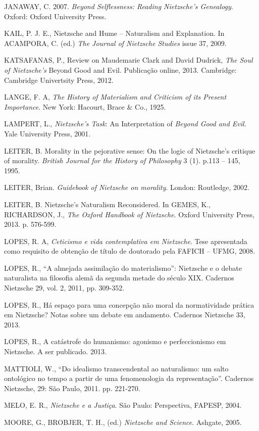 \documentclass[
	12pt,				%
	openright,			%
	oneside,			%
	a4paper,			%
	english,			%
	french,				%
	spanish,			%
	brazil				%
	]{abntex2}
\begin{document}
JANAWAY, C. 2007. \textit{Beyond Selflessness: Reading Nietzsche’s Genealogy}. Oxford: Oxford University Press.

KAIL, P. J. E., Nietzsche and Hume – Naturalism and Explanation. In ACAMPORA, C. (ed.) \textit{The Journal of Nietzsche Studies} issue 37, 2009.

KATSAFANAS, P., Review on Maudemarie Clark and David Dudrick, \textit{The Soul of Nietzsche’s} Beyond Good and Evil. Publicação online, 2013.
Cambridge: Cambridge Univertsity Press, 2012.

LANGE, F. A, \textit{The History of Materialism and Criticism of its Present Importance}.  New York: Hacourt, Brace \& Co., 1925.

LAMPERT, L., \textit{Nietzsche's Task}: An Interpretation of \textit{Beyond Good and Evil}. Yale University Press, 2001.

LEITER, B. Morality in the pejorative sense: On the logic of Nietzsche's critique of morality. \textit{British Journal for the History of Philosophy }3 (1). p.113 – 145, 1995.

LEITER, Brian. \textit{Guidebook of Nietzsche on morality}. London: Routledge, 2002. 

LEITER, B. Nietzsche's Naturalism Reconsidered. In GEMES, K., RICHARDSON, J., \textit{The Oxford Handbook of Nietzsche}. Oxford University Press, 2013. p. 576-599.

LOPES, R. A, \textit{Ceticismo e vida contemplativa em Nietzsche}. Tese apresentada como requisito de obtenção de título de doutorado pela FAFICH – UFMG, 2008.

LOPES, R., “A almejada assimilação do materialismo”: Nietzsche e o debate naturalista na filosofia alemã da segunda metade do século XIX. Cadernos Nietzsche 29, vol. 2, 2011, pp. 309-352.

LOPES, R., Há espaço para uma concepção não moral da normatividade prática em Nietzsche? Notas sobre um debate em andamento. Cadernos Nietzsche 33, 2013.

LOPES, R., A catástrofe do humanismo: agonismo e perfeccionismo em Nietzsche. A ser publicado. 2013.

MATTIOLI, W., “Do idealismo transcendental ao naturalismo: um salto ontológico no tempo a partir de uma fenomenologia da representação”. Cadernos Nietzsche, 29: São Paulo, 2011. pp. 221-270.

MELO, E. R., \textit{Nietzsche e a Justiça}. São Paulo: Perspectiva, FAPESP, 2004.

MOORE, G., BROBJER, T. H., (ed.) \textit{Nietzsche and Science}. Ashgate, 2005.
\end{document}
